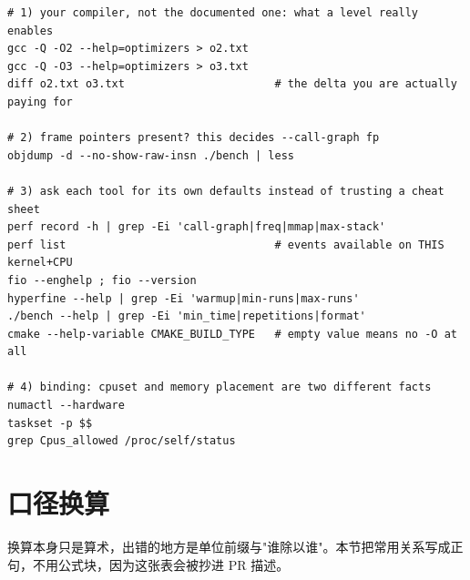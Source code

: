 \documentclass[12pt,a4paper,fontset=fandol]{ctexbook}
\begin{document}
\begin{lstlisting}[style=shellstyle,caption={参数与默认值的自查命令：让工具自己说，别背},label={lst:pmapB-selfcheck}]
# 1) your compiler, not the documented one: what a level really enables
gcc -Q -O2 --help=optimizers > o2.txt
gcc -Q -O3 --help=optimizers > o3.txt
diff o2.txt o3.txt                       # the delta you are actually paying for

# 2) frame pointers present? this decides --call-graph fp
objdump -d --no-show-raw-insn ./bench | less

# 3) ask each tool for its own defaults instead of trusting a cheat sheet
perf record -h | grep -Ei 'call-graph|freq|mmap|max-stack'
perf list                                # events available on THIS kernel+CPU
fio --enghelp ; fio --version
hyperfine --help | grep -Ei 'warmup|min-runs|max-runs'
./bench --help | grep -Ei 'min_time|repetitions|format'
cmake --help-variable CMAKE_BUILD_TYPE   # empty value means no -O at all

# 4) binding: cpuset and memory placement are two different facts
numactl --hardware
taskset -p $$
grep Cpus_allowed /proc/self/status
\end{lstlisting}

\section{口径换算}
\label{sec:pmapB-convert}

换算本身只是算术，出错的地方是单位前缀与"谁除以谁"。本节把常用关系写成正句，不用公式块，因为这张表会被抄进 PR 描述。
\end{document}
